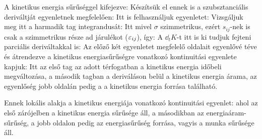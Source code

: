     A kinetikus energia sűrűséggel kifejezve:
    Készítsük el ennek is a szubsztanciális deriváltját  egyenletnek megfelelően:
    Itt is felhasználjuk  egyenletet:
    Vizsgáljuk meg itt a harmadik tag integrandusát: 
    Itt mivel $\sigma$ szimmetrikus, ezért $s_{ij}$-nek is csak a szimmetrikus része ad járulékot ($\varepsilon_{ij}$), így:
    A $\dd_tK$-t itt is ki tudjuk fejteni parciális deriváltakkal is:
    Az előző két egyenletet megfelelő oldalait egyenlővé téve és átrendezve a kinetikus energiasűrűségre vonatkozó kontinuitási egyenlete kapjuk:
    Itt az első tag az adott térfogatban a kinetikus energia időbeli megváltozása, a második tagban a deriváláson belül a kinetikus energia árama, az egyenlőség jobb oldalán pedig a a kinetikus energia forrása található. 
    
    Ennek lokális alakja a kinetikus energiája vonatkozó kontinuitási egyenlet:
    ahol az első zárójelben a kinetikus energia sűrűsége áll, a másodikban az energiaáram-sűrűség, a jobb oldalon pedig az energiasűrűség forrása, vagyis a munka sűrűsége áll. 
    
